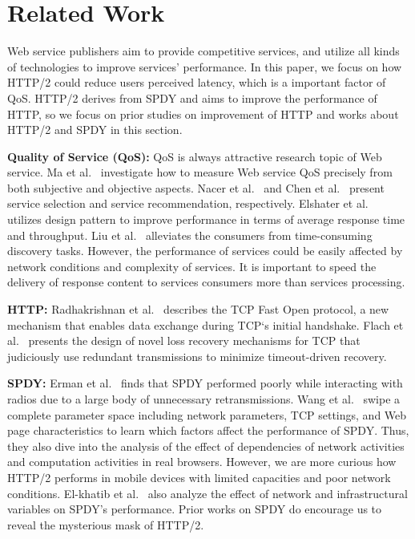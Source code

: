 \section{Related Work}
Web service publishers aim to provide competitive services, and utilize all kinds of technologies to improve services' performance. In this paper, we focus on how HTTP/2 could reduce users perceived latency, which is a important factor of QoS. HTTP/2 derives from SPDY and aims to improve the performance of HTTP, so we focus on prior studies on improvement of HTTP and works about HTTP/2 and SPDY in this section.

\textbf{Quality of Service (QoS):} QoS is always attractive research topic of Web service. Ma et al.~\cite{Ma:SCC13} investigate how to measure Web service QoS precisely from both subjective and objective aspects. Nacer et al.~\cite{Ahmed-Nacer:SCC15} and Chen et al.~\cite{Chen:SCC15} present service selection and service recommendation, respectively. Elshater et al.~\cite{Elshater:SCC15} utilizes design pattern to improve performance in terms of average response time and throughput. Liu et al.~\cite{liuTSC2009}  alleviates the consumers from time-consuming discovery tasks. However, the performance of services could be easily affected by network conditions and complexity of services. It is important to speed the delivery of response content to services consumers more than services processing. 

\textbf{HTTP:} Radhakrishnan et al.~\cite{Radhakrishnan:CONEXT11} describes the TCP Fast Open protocol, a new mechanism that enables data exchange during TCP`s initial handshake. Flach et al.~\cite{Flach:SIGCOMM13} presents the design of novel loss recovery mechanisms for TCP that judiciously use redundant transmissions to minimize timeout-driven recovery.



\textbf{SPDY:} Erman et al.~\cite{Erman:CONEXT13} finds that SPDY performed poorly while interacting with radios due to a large body of unnecessary retransmissions. Wang et al.~\cite{Wang:NSDI14} swipe a complete parameter space including network parameters, TCP settings, and Web page characteristics to learn which factors affect the performance of SPDY. Thus, they also dive into the analysis of the effect of dependencies of network activities and computation activities in real browsers. However, we are more curious how HTTP/2 performs in mobile devices with limited capacities and poor network conditions. El-khatib et al.~\cite{El-khatibTW:IFIP14} also analyze the effect of network and infrastructural variables on SPDY's performance. Prior works on SPDY do encourage us to reveal the mysterious mask of HTTP/2. 


